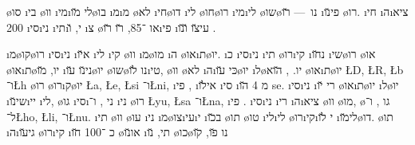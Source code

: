 \o{סו} \i{בי} \o{וו} \i{מי}\i{לי} \u{מו}\o{בו} \i{מ}\i{מ} \o{לא}   \i{חי}\o{דו} \i{לי} \o{חו}\o{רו}  \i{מי}\i{לי} \o{שו}\o{נו}~—  \u{רו} \i{פי}\u{נו} \o{רו}. \i{חי} \i{ה}\i{ציא} 200 \i{סי}\i{ני} \i{תי}\i{י}, \u{ו}  \i{צ} \o{או} ־85, \u{רו} \u{רו}\i{פי}  \i{עי}\u{צו}  \u{ו}\u{נו} .

 \i{מ}\o{קו}\o{רו} \i{סי}\i{ני}   \i{א}\u{יו} \i{לי} \i{קי} \o{וו} \i{מ}\o{מו}    \i{ה}  \o{או}\i{ת}\o{יו}. \i{כ}  \i{סי}\i{ני}  \i{תי} \o{רו}\i{קי} \i{נ}\u{חו} \i{שי}\o{רו} \o{או} \o{או}\i{ת}\o{יו},  \u{מו} \i{ני}\u{נו}  \u{עו}\o{יו} \o{שו}\o{נו} \u{לו}\i{טי},  \o{וו} \o{לא} \i{ה}\i{כּי}  \u{עו}\o{יו} \i{ל}\o{יו}. , \u{הוא}   \o{או}\i{ת}\o{יו} \L{D}, \L{R}, \L{b} ו־\L{h}   \o{רו} \o{רו}\i{ק}\o{יו} \L{a}, \L{e}, \L{si} ו־\L{ni}, \i{פי}  , \i{אי}\u{לו} \i{סי} \i{מ} 4 \u{הו}  se. \i{סי}\i{ני} \i{רי} \u{יו} \o{או}\i{ת}\o{יו} \i{ל}\o{יו} \i{שי}\u{נו}\i{יי} \i{לי}, \o{גו} \i{סי}\i{ני} ,  ו־ \i{ני}  \o{רו} \L{yu}, \L{sa} ו־\L{na}, \i{פי}  . \i{סי}\i{ני} \i{רי} \i{ה}\i{ציא} \o{וו} \o{מו}, \o{גו} ,  ו־ ל־\L{ho}, \L{li}, ו־\L{nu}.  \i{תי}  \o{וו} \o{עו}    \i{ני} \i{מ}\o{צו}\i{עי}\i{י} \i{ב}\u{כו} \o{תו} \o{טו} \i{לי}\i{לי} \o{רו}\i{קי}\i{י} \u{לו} \i{לי}\u{מו}\o{דו}. \o{תו}   \i{ה}\i{גי}\u{עו} \o{רו}\i{קי} \i{כ} ־100 \u{חו} \o{או}\u{נו}  \i{תי}, \u{נו} \o{כו}\o{נו} \u{פו}, \u{קו} 